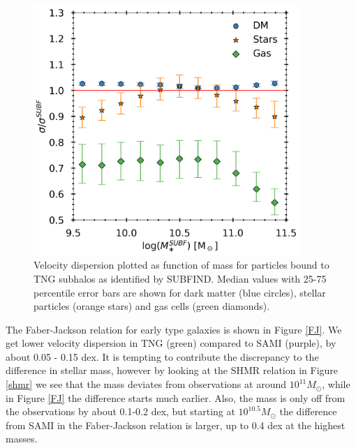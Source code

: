 \begin{figure}
    \centering
    \includegraphics[width=0.9\textwidth]{images/VD_particles.png}
    \caption{Velocity dispersion plotted as function of mass for particles bound to TNG subhalos as identified by SUBFIND. Median values with 25-75 percentile error bars are shown for dark matter (blue circles), stellar particles (orange stars) and gas cells (green diamonds).}
    \label{VD_part}
\end{figure}

The Faber-Jackson relation for early type galaxies is shown in Figure \ref{FJ}. We get lower velocity dispersion in TNG (green) compared to SAMI (purple), by about 0.05 - 0.15 dex. It is tempting to contribute the discrepancy to the difference in stellar mass, however by looking at the SHMR relation in Figure \ref{shmr} we see that the mass deviates from observations at around $10^{11} M_{\odot}$, while in Figure \ref{FJ} the difference starts much earlier. Also, the mass is only off from the observations by about 0.1-0.2 dex, but starting at $10^{10.5} M_{\odot}$ the difference from SAMI in the Faber-Jackson relation is larger, up to 0.4 dex at the highest masses.


